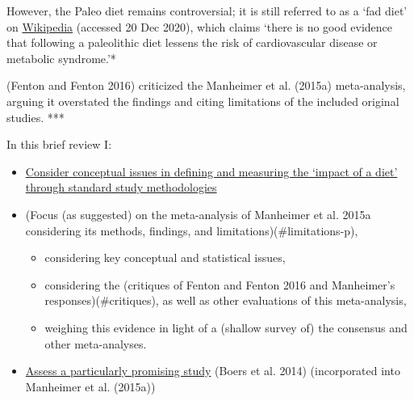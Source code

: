 \documentclass[]{tufte-handout}
\providecommand{\tightlist}{%
  \setlength{\itemsep}{0pt}\setlength{\parskip}{0pt}}
\begin{document}
However, the Paleo diet remains controversial; it is still referred to
as a `fad diet' on
\href{https://en.wikipedia.org/wiki/Paleolithic_diet}{Wikipedia}
(accessed 20 Dec 2020), which claims `there is no good evidence that
following a paleolithic diet lessens the risk of cardiovascular disease
or metabolic syndrome.'*


(Fenton and Fenton 2016) criticized the Manheimer et al. (2015a)
meta-analysis, arguing it overstated the findings and citing limitations
of the included original studies. ***


\hfill\break

In this brief review I:

\begin{itemize}
\item
  \protect\hyperlink{conceptual}{Consider conceptual issues in defining
  and measuring the `impact of a diet' through standard study
  methodologies}
\item
  (Focus (as suggested) on the meta-analysis of Manheimer et al. 2015a
  considering its methods, findings, and limitations)(\#limitations-p),

  \begin{itemize}
  \tightlist
  \item
    considering key conceptual and statistical issues,
  \item
    considering the (critiques of Fenton and Fenton 2016 and Manheimer's
    responses)(\#critiques), as well as other evaluations of this
    meta-analysis,
  \item
    weighing this evidence in light of a (shallow survey of) the
    consensus and other meta-analyses.
  \end{itemize}
\item
  \protect\hyperlink{boers}{Assess a particularly promising study}
  (Boers et al. 2014) (incorporated into Manheimer et al. (2015a))
\end{itemize}
\end{document}
